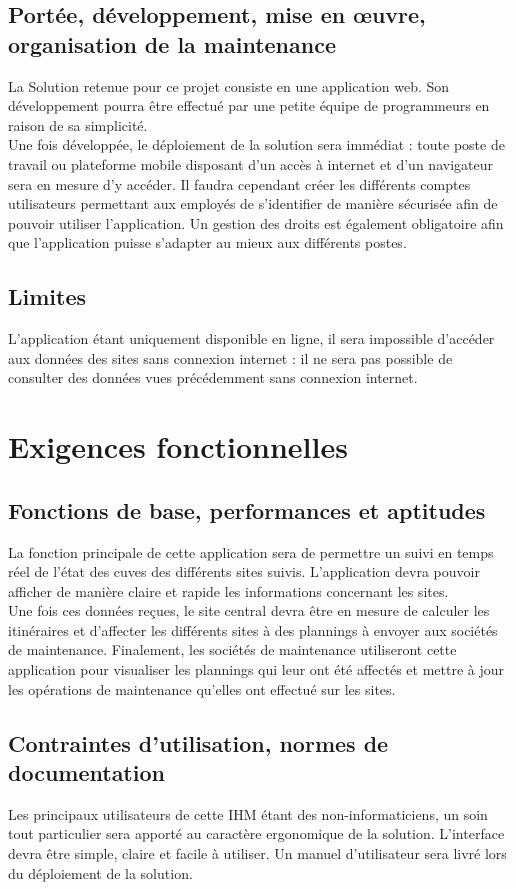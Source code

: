 \subsection{Portée, développement, mise en œuvre, organisation de la maintenance}
La Solution retenue pour ce projet consiste en une application web. Son développement pourra être effectué par une petite équipe de programmeurs en raison de sa simplicité.\\
Une fois développée, le déploiement de la solution sera immédiat : toute poste de travail ou plateforme mobile disposant d'un accès à internet et d'un navigateur sera en mesure d'y accéder. Il faudra cependant créer les différents comptes utilisateurs permettant aux employés de s'identifier de manière sécurisée afin de pouvoir utiliser l'application. Un gestion des droits est également obligatoire afin que l'application puisse s'adapter au mieux aux différents postes.

\subsection{Limites}
L'application étant uniquement disponible en ligne, il sera impossible d'accéder aux données des sites sans connexion internet : il ne sera pas possible de consulter des données vues précédemment sans connexion internet. 

\section{Exigences fonctionnelles}
\subsection{Fonctions de base, performances et aptitudes}
La fonction principale de cette application sera de permettre un suivi en temps réel de l'état des cuves des différents sites suivis. L'application devra pouvoir afficher de manière claire et rapide les informations concernant les sites.\\
Une fois ces données reçues, le site central devra être en mesure de calculer les itinéraires et d'affecter les différents sites à des plannings à envoyer aux sociétés de maintenance. Finalement, les sociétés de maintenance utiliseront cette application pour visualiser les plannings qui leur ont été affectés et mettre à jour les opérations de maintenance qu'elles ont effectué sur les sites.

\subsection{Contraintes d'utilisation, normes de documentation}
Les principaux utilisateurs de cette IHM étant des non-informaticiens, un soin tout particulier sera apporté au caractère ergonomique de la solution. L'interface devra être simple, claire et facile à utiliser. Un manuel d'utilisateur sera livré lors du déploiement de la solution.

